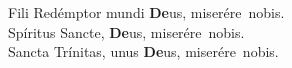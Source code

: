 
\newHymn

\JustHymnNum
{}



\def\accent#1{\textbf{#1}}










\pointtrans
{}


Fili Redémptor mundi \textbf{De}us, \hfill\mbox{miserére nobis.\hskip2.6cm}\\
Spíritus Sancte, \textbf{De}us, \hfill\mbox{miserére nobis.\hskip2.6cm}\\
Sancta Trínitas, unus \textbf{De}us, \hfill\mbox{miserére nobis.\hskip2.6cm}\\

\vskip-10pt





